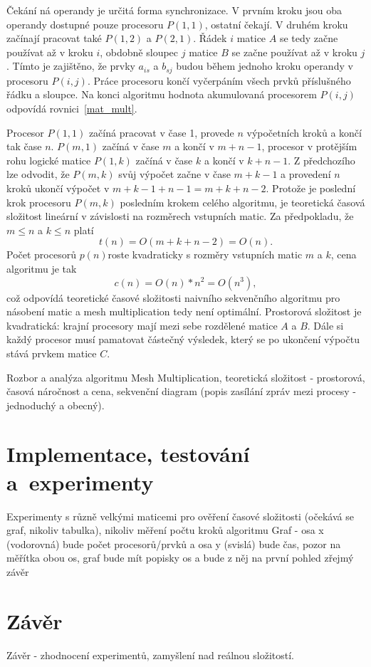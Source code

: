 \documentclass[a4paper, 12pt]{article}[24.4.2015]
\begin{document}
Čekání ná operandy je určitá forma synchronizace. V prvním kroku jsou oba operandy dostupné pouze procesoru \(P(1,1)\), ostatní čekají. V druhém kroku začínají pracovat také \(P(1,2)\) a \(P(2,1)\). Řádek \(i\) matice \(A\) se tedy začne používat až v kroku \(i\), obdobně sloupec \(j\) matice \(B\) se začne používat až v kroku \(j\). Tímto je zajištěno, že prvky \(a_{is}\) a \(b_{sj}\) budou během jednoho kroku operandy v procesoru \(P(i,j)\). Práce procesoru končí vyčerpáním všech prvků příslušného řádku a sloupce. Na konci algoritmu hodnota akumulovaná procesorem \(P(i,j)\) odpovídá rovnici~\ref{mat_mult}.

Procesor \(P(1,1)\) začíná pracovat v čase 1, provede \(n\) výpočetních kroků a končí tak čase \(n\). \(P(m, 1)\) začíná v čase \(m\) a končí v \(m + n - 1\), procesor v protějším rohu logické matice \(P(1, k)\) začíná v čase \(k\) a končí v \(k + n - 1\). Z předchozího lze odvodit, že \(P(m, k)\) svůj výpočet začne v čase \(m + k - 1\) a provedení \(n\) kroků ukončí výpočet v \(m + k - 1 + n - 1 = m + k + n - 2\). Protože je poslední krok procesoru \(P(m, k)\) posledním krokem celého algoritmu, je teoretická časová složitost lineární v závislosti na rozměrech vstupních matic. Za předpokladu, že \(m \leq n\) a \(k \leq n\) platí
\[
t(n) = O(m + k + n - 2) = O(n).
\]
Počet procesorů \(p(n)\)roste kvadraticky s rozměry vstupních matic \(m\) a \(k\), cena algoritmu je tak
\[
c(n) = O(n) * n^2 = O(n^3),
\]
což odpovídá teoretické časové složitosti naivního sekvenčního algoritmu pro násobení matic a mesh multiplication tedy není optimální. Prostorová složitost je kvadratická: krajní procesory mají mezi sebe rozdělené matice \(A\) a \(B\). Dále si každý procesor musí pamatovat částečný výsledek, který se po ukončení výpočtu stává prvkem matice \(C\).

Rozbor a analýza algoritmu Mesh Multiplication, teoretická složitost - prostorová, časová náročnost a cena, sekvenční diagram (popis zasílání zpráv mezi procesy - jednoduchý a obecný).

\section{Implementace, testování a~experimenty} \label{experiments}
Experimenty s různě velkými maticemi pro ověření časové složitosti (očekává se graf, nikoliv tabulka), nikoliv měření počtu kroků algoritmu
Graf - osa x (vodorovná) bude počet procesorů/prvků a osa y (svislá) bude čas, pozor na měřítka obou os, graf bude mít popisky os a bude z něj na první pohled zřejmý závěr

\section{Závěr}\label{conclusion}
Závěr - zhodnocení experimentů, zamyšlení nad reálnou složitostí.
\end{document}
